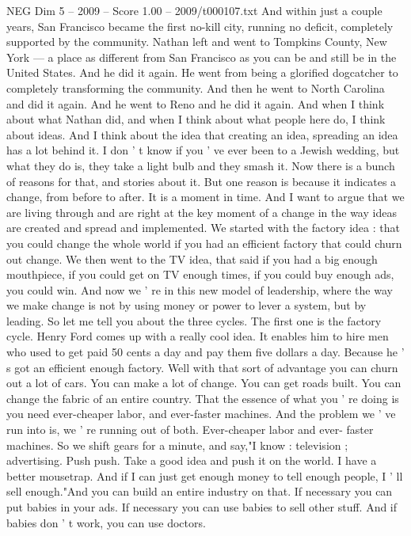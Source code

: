 \begin{textsample}{NEG Dim 5 – 2009 – Score 1.00 – 2009/t000107.txt}
And within just a couple years, San Francisco became the first no-kill city, running no deficit, completely supported by the community.
Nathan left and went to Tompkins County, New York — a place as different from San Francisco as you can be and still be in the United States.
And he did it again.
He went from being a glorified dogcatcher to completely transforming the community.
And then he went to North Carolina and did it again.
And he went to Reno and he did it again.
And when I think about what Nathan did, and when I think about what people here do, I think about ideas.
And I think about the idea that creating an idea, spreading an idea has a lot behind it.
I don ' t know if you ' ve ever been to a Jewish wedding, but what they do is, they take a light bulb and they smash it.
Now there is a bunch of reasons for that, and stories about it.
But one reason is because it indicates a change, from before to after.
It is a moment in time.
And I want to argue that we are living through and are right at the key moment of a change in the way ideas are created and spread and implemented.
We started with the factory idea : that you could change the whole world if you had an efficient factory that could churn out change.
We then went to the TV idea, that said if you had a big enough mouthpiece, if you could get on TV enough times, if you could buy enough ads, you could win.
And now we ' re in this new model of leadership, where the way we make change is not by using money or power to lever a system, but by leading.
So let me tell you about the three cycles.
The first one is the factory cycle.
Henry Ford comes up with a really cool idea.
It enables him to hire men who used to get paid 50 cents a day and pay them five dollars a day.
Because he ' s got an efficient enough factory.
Well with that sort of advantage you can churn out a lot of cars.
You can make a lot of change.
You can get roads built.
You can change the fabric of an entire country.
That the essence of what you ' re doing is you need ever-cheaper labor, and ever-faster machines.
And the problem we ' ve run into is, we ' re running out of both.
Ever-cheaper labor and ever- faster machines.
So we shift gears for a minute, and say,"I know : television ; advertising.
Push push.
Take a good idea and push it on the world.
I have a better mousetrap.
And if I can just get enough money to tell enough people, I ' ll sell enough."And you can build an entire industry on that.
If necessary you can put babies in your ads.
If necessary you can use babies to sell other stuff.
And if babies don ' t work, you can use doctors.

\end{textsample}
